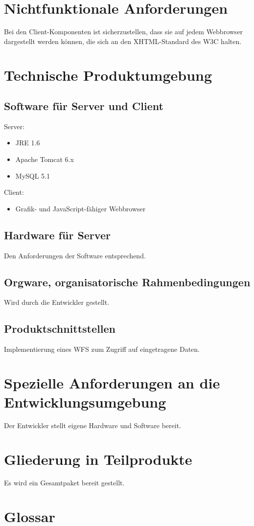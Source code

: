 \documentclass[a4paper,11pt]{scrartcl}
\begin{document}
\section{Nichtfunktionale Anforderungen}
	Bei den Client-Komponenten ist sicherzustellen, dass sie auf jedem Webbrowser dargestellt werden können, die sich an den XHTML-Standard des W3C halten.
\section{Technische Produktumgebung}
	\subsection{Software für Server und Client}
		Server:
		\begin{itemize}
			\item JRE 1.6
			\item Apache Tomcat 6.x
			\item MySQL 5.1
		\end{itemize}
		Client:
		\begin{itemize}
			\item Grafik- und JavaScript-fähiger Webbrowser
		\end{itemize}
	\subsection{Hardware für Server}
		Den Anforderungen der Software entsprechend.
	\subsection{Orgware, organisatorische Rahmenbedingungen}
		Wird durch die Entwickler gestellt.
	\subsection{Produktschnittstellen}
		Implementierung eines WFS zum Zugriff auf eingetragene Daten.
\section{Spezielle Anforderungen an die Entwicklungsumgebung}
	Der Entwickler stellt eigene Hardware und Software bereit.
\section{Gliederung in Teilprodukte}
	Es wird ein Gesamtpaket bereit gestellt.

\section{Glossar}
\end{document}

